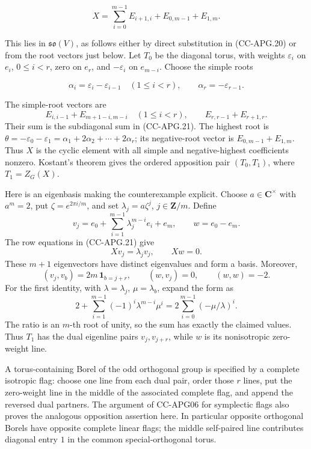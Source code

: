 \documentclass[11pt,a4paper]{article}
\theoremstyle{definition}\newtheorem{definition}[theorem]{Definition}
\theoremstyle{remark}\newtheorem{remark}[theorem]{Remark}
\begin{document}
\[
 X=\sum_{i=0}^{m-1}E_{i+1,i}
       +E_{0,m-1}+E_{1,m}.
 \tag{CC-APG.21}
\]

This lies in \(\mathfrak{so}(V)\), as follows either by direct
substitution in (CC-APG.20) or from the root vectors just below. Let
\(T_0\) be the diagonal torus, with weights \(\varepsilon_i\) on
\(e_i\), \(0\leq i<r\), zero on \(e_r\), and \(-\varepsilon_i\) on
\(e_{m-i}\). Choose the simple roots

\[
 \alpha_i=\varepsilon_i-\varepsilon_{i-1}\quad(1\leq i<r),
 \qquad \alpha_r=-\varepsilon_{r-1}.
\]

The simple-root vectors are \[
 E_{i,i-1}+E_{m+1-i,m-i}\quad(1\leq i<r),
 \qquad E_{r,r-1}+E_{r+1,r}.
\] Their sum is the subdiagonal sum in (CC-APG.21). The highest root is
\(\theta=-\varepsilon_0-\varepsilon_1
=\alpha_1+2\alpha_2+\cdots+2\alpha_r\); its negative-root vector is
\(E_{0,m-1}+E_{1,m}\). Thus \(X\) is the cyclic element with all simple
and negative-highest coefficients nonzero. Kostant's theorem gives the
ordered apposition pair \((T_0,T_1)\), where \(T_1=Z_G(X)\).

Here is an eigenbasis making the counterexample explicit. Choose
\(a\in\mathbf C^\times\) with \(a^m=2\), put \(\zeta=e^{2\pi i/m}\), and
set \(\lambda_j=a\zeta^j\), \(j\in\mathbf Z/m\). Define \[
 v_j=e_0+\sum_{i=1}^{m-1}\lambda_j^{m-i}e_i+e_m,
 \qquad w=e_0-e_m.
 \tag{CC-APG.22}
\] The row equations in (CC-APG.21) give \[
 Xv_j=\lambda_jv_j,\qquad Xw=0.
\] These \(m+1\) eigenvectors have distinct eigenvalues and form a
basis. Moreover, \[
 (v_j,v_b)=2m\,\mathbf 1_{b=j+r},\qquad
 (w,v_j)=0,\qquad(w,w)=-2.
 \tag{CC-APG.23}
\] For the first identity, with \(\lambda=\lambda_j\),
\(\mu=\lambda_b\), expand the form as \[
 2+\sum_{i=1}^{m-1}(-1)^i\lambda^{m-i}\mu^i
   =2\sum_{i=0}^{m-1}(-\mu/\lambda)^i.
\] The ratio is an \(m\)-th root of unity, so the sum has exactly the
claimed values. Thus \(T_1\) has the dual eigenline pairs
\(v_j,v_{j+r}\), while \(w\) is its nonisotropic zero-weight line.

A torus-containing Borel of the odd orthogonal group is specified by a
complete isotropic flag: choose one line from each dual pair, order
those \(r\) lines, put the zero-weight line in the middle of the
associated complete flag, and append the reversed dual partners. The
argument of CC-APG06 for symplectic flags also proves the analogous
opposition assertion here. In particular opposite orthogonal Borels have
opposite complete linear flags; the middle self-paired line contributes
diagonal entry \(1\) in the common special-orthogonal torus.
\end{document}
